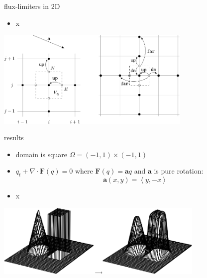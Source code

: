 \documentclass[10pt,hyperref,dvipsnames]{beamer}
\newcommand{\ba}{\mathbf{a}}
\newcommand{\bF}{\mathbf{F}}
\newcommand{\Div}{\nabla\cdot}
\begin{document}
\begin{frame}{flux-limiters in 2D}

\begin{itemize}
\item x
\end{itemize}

\begin{center}
\includegraphics[width=0.7\textwidth]{figs/bueler11p8}
\end{center}
\end{frame}


\begin{frame}{results}

\begin{itemize}
\item domain is square $\Omega = (-1,1) \times (-1,1)$
\item $q_t + \Div \bF(q) = 0$ where $\bF(q) = \ba q$ and $\ba$ is pure rotation:
    $$\ba(x,y) = \left<y,-x\right>$$
\item x
\end{itemize}

\hfill \includegraphics[width=0.75\textwidth]{figs/bueler11p7}
\end{frame}
\end{document}
